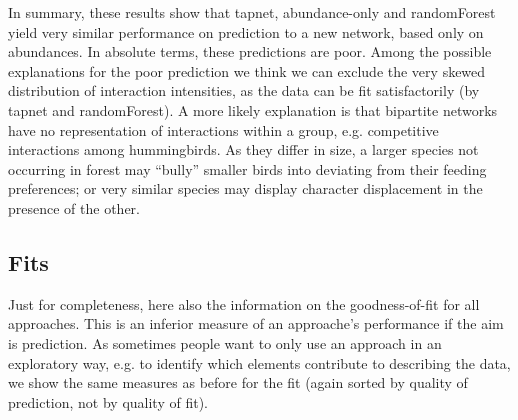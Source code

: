 \documentclass[a4paper, 11pt]{article}\usepackage[]{graphicx}\usepackage[]{color}
\begin{document}
In summary, these results show that tapnet, abundance-only and randomForest yield very similar performance on prediction to a new network, based only on abundances. In absolute terms, these predictions are poor. Among the possible explanations for the poor prediction we think we can exclude the very skewed distribution of interaction intensities, as the data can be fit satisfactorily (by tapnet and randomForest). A more likely explanation is that bipartite networks have no representation of interactions within a group, e.g. competitive interactions among hummingbirds. As they differ in size, a larger species not occurring in forest may ``bully'' smaller birds into deviating from their feeding preferences; or very similar species may display character displacement in the presence of the other.


\subsection{Fits}
Just for completeness, here also the information on the goodness-of-fit for all approaches. This is an inferior measure of an approache's performance if the aim is prediction. As sometimes people want to only use an approach in an exploratory way, e.g. to identify which elements contribute to describing the data, we show the same measures as before for the fit (again sorted by quality of prediction, not by quality of fit).
\end{document}
